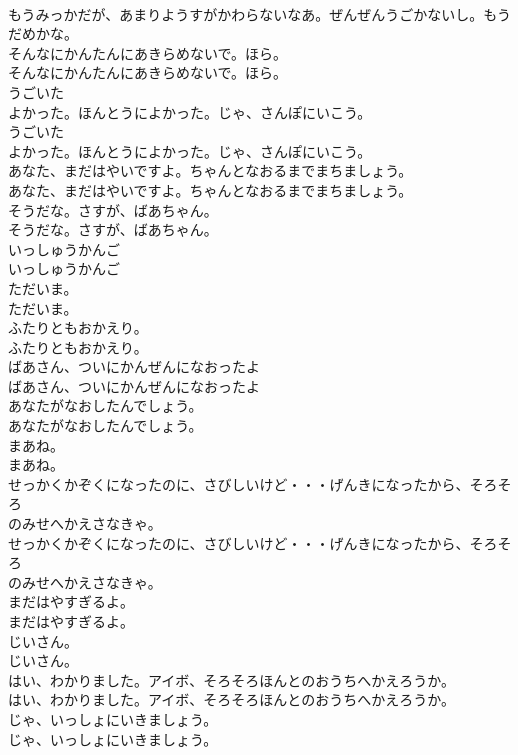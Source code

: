 \documentclass[8pt]{extreport}
\begin{document}
\begin{CJK}{UTF8}{min}
\\	もうみっかだが、あまりようすがかわらないなあ。ぜんぜんうごかないし。もうだめかな。
\\	そんなにかんたんにあきらめないで。ほら。
\\	そんなにかんたんにあきらめないで。ほら。
\\	うごいた
\\	よかった。ほんとうによかった。じゃ、さんぽにいこう。
\\	うごいた
\\	よかった。ほんとうによかった。じゃ、さんぽにいこう。
\\	あなた、まだはやいですよ。ちゃんとなおるまでまちましょう。
\\	あなた、まだはやいですよ。ちゃんとなおるまでまちましょう。
\\	そうだな。さすが、ばあちゃん。
\\	そうだな。さすが、ばあちゃん。
\\	いっしゅうかんご
\\	いっしゅうかんご
\\	ただいま。
\\	ただいま。
\\	ふたりともおかえり。
\\	ふたりともおかえり。
\\	ばあさん、ついにかんぜんになおったよ
\\	ばあさん、ついにかんぜんになおったよ
\\	あなたがなおしたんでしょう。
\\	あなたがなおしたんでしょう。
\\	まあね。
\\	まあね。
\\	せっかくかぞくになったのに、さびしいけど・・・げんきになったから、そろそろ
\\	のみせへかえさなきゃ。
\\	せっかくかぞくになったのに、さびしいけど・・・げんきになったから、そろそろ
\\	のみせへかえさなきゃ。
\\	まだはやすぎるよ。
\\	まだはやすぎるよ。
\\	じいさん。
\\	じいさん。
\\	はい、わかりました。アイボ、そろそろほんとのおうちへかえろうか。
\\	はい、わかりました。アイボ、そろそろほんとのおうちへかえろうか。
\\	じゃ、いっしょにいきましょう。
\\	じゃ、いっしょにいきましょう。

\end{CJK}
\end{document}
